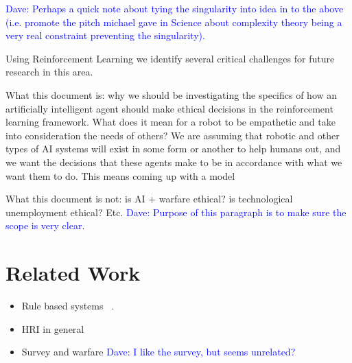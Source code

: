 \documentclass[11pt]{article}
\newcommand\davenote[1]{\textcolor{blue}{Dave: #1}}
\begin{document}
\davenote{Perhaps a quick note about tying the singularity into idea in to the above (i.e. promote the pitch michael gave in Science about complexity theory being a very real constraint preventing the singularity).}

Using Reinforcement Learning we identify several critical challenges for future research in this area.

What this document is: why we should be investigating the specifics of how an artificially intelligent agent should make ethical decisions in the reinforcement learning framework. What does it mean for a robot to be empathetic and take into consideration the needs of others? We are assuming that robotic and other types of AI systems will exist in some form or another to help humans out, and we want the decisions that these agents make to be in accordance with what we want them to do. This means coming up with a model 

What this document is not: is AI + warfare ethical? is technological unemployment ethical? Etc. \davenote{Purpose of this paragraph is to make sure the scope is very clear.}


\section{Related Work}

\begin{itemize}
\item Rule based systems ~\cite{briggs2015sorry}. 
\item HRI in general~\cite{scheutz2007first,tellex2011understanding}
\item Survey and warfare \davenote{I like the survey, but seems unrelated?}
\end{itemize}
\end{document}
